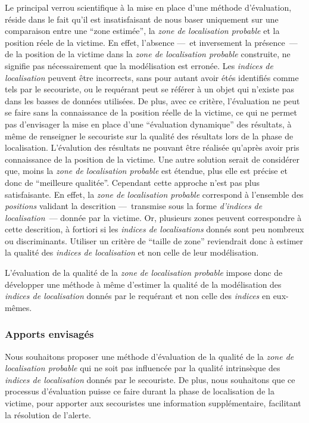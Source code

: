 Le principal verrou scientifique à la mise en place d'une méthode
d'évaluation, réside dans le fait qu'il est insatisfaisant de nous
baser uniquement sur une comparaison entre une \enquote{zone estimée},
\ie la \emph{zone de localisation probable} et la position réele de la
victime. En effet, l'absence ---~et inversement la présence~--- de la
position de la victime dans la \emph{zone de localisation probable}
construite, ne signifie pas nécessairement que la modélisation est
erronée. Les \emph{indices de localisation} peuvent être incorrects,
sans pour autant avoir étés identifiés comme tels par le secouriste,
ou le requérant peut se référer à un objet qui n'existe pas dans les
basses de données utilisées. De plus, avec ce critère, l'évaluation ne
peut se faire sans la connaissance de la position réelle de la
victime, ce qui ne permet pas d'envisager la mise en place d'une
\enquote{évaluation dynamique} des résultats, à même de renseigner le
secouriste sur la qualité des résultats lors de la phase de
localisation. L'évalution des résultats ne pouvant être réalisée
qu'après avoir pris connaissance de la position de la victime. Une
autre solution serait de considérer que, moins la \emph{zone de
  localisation probable} est étendue, plus elle est précise et donc de
\enquote{meilleure qualitée}. Cependant cette approche n'est pas plus
satisfaisante.  En effet, la \emph{zone de localisation probable}
correspond à l'ensemble des \emph{positions} validant la descrition
---~transmise sous la forme \emph{d'indices de localisation}~---
donnée par la victime. Or, plusieurs zones peuvent correspondre à
cette descrition, à fortiori si les \emph{indices de localisations}
donnés sont peu nombreux ou discriminants. Utiliser un critère de
\enquote{taille de zone} reviendrait donc à estimer la qualité des
\emph{indices de localisation} et non celle de leur modélisation.

L’évaluation de la qualité de la \emph{zone de localisation probable}
impose donc de développer une méthode à même d'estimer la qualité de
la modélisation des \emph{indices de localisation} donnés par le
requérant et non celle des \emph{indices} en eux-mêmes. 

\subsubsection{Apports envisagés}

Nous souhaitons proposer une méthode d'évaluation de la qualité de la
\emph{zone de localisation probable} qui ne soit pas influencée par la
qualité intrinsèque des \emph{indices de localisation} donnés par le
secouriste. De plus, nous souhaitons que ce processus d'évaluation
puisse ce faire durant la phase de localisation de la victime, pour
apporter aux secouristes une information supplémentaire, facilitant la
résolution de l'alerte.

